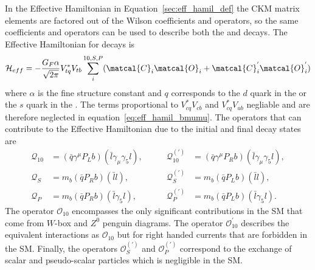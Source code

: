 {{%
In the Effective Hamiltonian in Equation~\ref{sec:eff_hamil_def} the CKM matrix elements are factored out of the Wilson coefficients and operators, so the same coefficients and operators can be used to describe both the \bd and \bs decays.
The Effective Hamiltonian for \bmumu decays is~\cite{DeBruyn:2012wk}
\begin{equation}
\mathcal{H}_{eff} = -\frac{G_F \alpha}{\sqrt{2\pi}} V_{tq}^{*}V_{tb} \displaystyle\sum_{i}^{10,S,P} (\matcal{C}_i\matcal{O}_i + \matcal{C}^{'}_{i}\matcal{O}_{i}^{'})
\label{eq:eff_hamil_bmumu}
\end{equation}
where $\alpha$ is the fine structure constant and $q$ corresponds to the $d$ quark in the \bd or the $s$ quark in the \bs. The terms proportional to $V^*_{cq}V_{cb}$ and $V^*_{cq}V_{ub}$ negliable and are therefore neglected in equation~\ref{eq:eff_hamil_bmumu}. The operators that can contribute to the \bmumu Effective Hamiltonian due to the initial and final decay states are
\begin{align}
 \mathcal{Q}_{10}&=(\bar{q}\gamma^{\mu}P_{L}b)(\bar{l}\gamma_{\mu}\gamma_{5}l), &\qquad
 \mathcal{Q}_{10}^{(')}&= (\bar{q}\gamma^{\mu}P_{R}b)(\bar{l}\gamma_{\mu}\gamma_{5}l), \\
 \mathcal{Q}_{S}&= m_{b}(\bar{q}P_{R}b)(\bar{l}l),  &\qquad
\mathcal{Q}_{S}^{(')}&= m_{b}(\bar{q}P_{L}b)(\bar{l}l), \\
 \mathcal{Q}_{P}&= m_{b}(\bar{q}P_{R}b)(\bar{l}\gamma_{5}l), &\qquad
 \mathcal{Q}_{P}^{(')}&= m_{b}(\bar{q}P_{L}b)(\bar{l}\gamma_{5}l).
\end{align}
The operator $\mathcal{O}_{10}$ encompasses the only significant contributions in the SM that come from $W$-box and $Z^0$ penguin diagrams. The operator $\mathcal{O}_{10}^'$ describes the equivalent interactions as $\mathcal{O}_{10}$ but for right handed currents that are forbidden in the SM. %
 Finally, the operators $\mathcal{O}_{S}^{(')}$ and $\mathcal{O}_{P}^{(')}$ correspond to the exchange of scalar and pseudo-scalar particles which is negligible in the SM. 

}}
